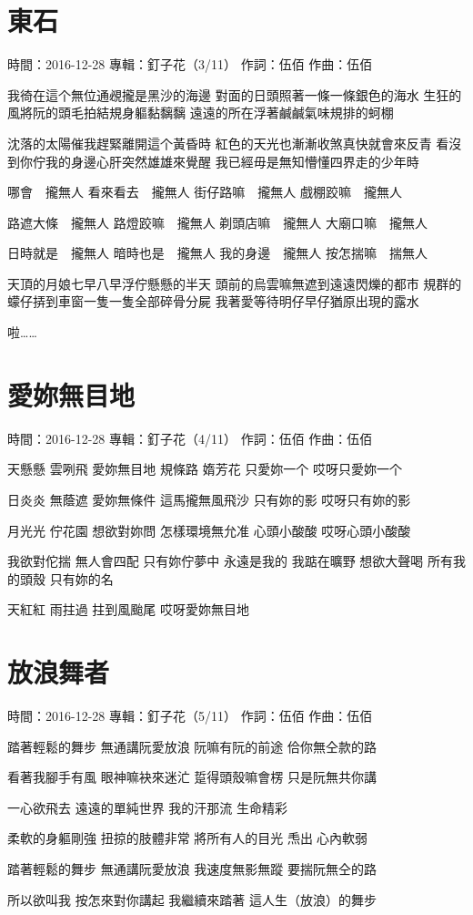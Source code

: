 \documentclass[UTF8,a4paper,oneside,twocolumn,12pt]{ctexbook}
\newcommand{\infopair}[2]{\textbullet #1：#2}
\newcommand{\zc}[1][伍佰]{\infopair{作詞}{#1}}
\newcommand{\zq}[1][伍佰]{\infopair{作曲}{#1}}
\newcommand{\zj}[1]{\infopair{專輯}{#1}}
\newcommand{\sj}[1]{\infopair{時間}{#1}}
\newenvironment{info}{\begin{flushleft}\kaishu
	}
	{\end{flushleft}\normalsize\yahei\par}
\newenvironment{lyric}{
	}
{}
\begin{document}
\section{東石}
\begin{info}
	\sj{2016-12-28}
	\zj{釘子花（3/11）}
	\zc
	\zq
\end{info}
\begin{lyric}
	我徛在這个無位通覕攏是黑沙的海邊
	對面的日頭照著一條一條銀色的海水
	生狂的風將阮的頭毛拍結規身軀黏黐黐
	遠遠的所在浮著鹹鹹氣味規排的蚵棚

	沈落的太陽催我趕緊離開這个黃昏時
	紅色的天光也漸漸收煞真快就會來反青
	看沒到你佇我的身邊心肝突然雄雄來覺醒
	我已經毋是無知懵懂四界走的少年時

	哪會　攏無人
	看來看去　攏無人
	街仔路嘛　攏無人
	戲棚跤嘛　攏無人

	路遮大條　攏無人
	路燈跤嘛　攏無人
	剃頭店嘛　攏無人
	大廟口嘛　攏無人

	日時就是　攏無人
	暗時也是　攏無人
	我的身邊　攏無人
	按怎揣嘛　揣無人

	天頂的月娘七早八早浮佇懸懸的半天
	頭前的烏雲嘛無遮到遠遠閃爍的都市
	規群的蠓仔挵到車窗一隻一隻全部碎骨分屍
	我著愛等待明仔早仔猶原出現的露水

	啦……
\end{lyric}

\section{愛妳無目地}
\begin{info}
	\sj{2016-12-28}
	\zj{釘子花（4/11）}
	\zc
	\zq
\end{info}
\begin{lyric}
	天懸懸 雲咧飛
	愛妳無目地
	規條路 媠芳花
	只愛妳一个 哎呀只愛妳一个

	日炎炎 無蔭遮
	愛妳無條件
	這馬攏無風飛沙
	只有妳的影 哎呀只有妳的影

	月光光 佇花園
	想欲對妳問
	怎樣環境無允准
	心頭小酸酸 哎呀心頭小酸酸

	我欲對佗揣 無人會四配
	只有妳佇夢中 永遠是我的
	我踮在曠野 想欲大聲喝
	所有我的頭殼 只有妳的名

	天紅紅 雨拄過
	拄到風颱尾 哎呀愛妳無目地
\end{lyric}

\section{放浪舞者}
\begin{info}
	\sj{2016-12-28}
	\zj{釘子花（5/11）}
	\zc
	\zq
\end{info}
\begin{lyric}
	踏著輕鬆的舞步
	無通講阮愛放浪
	阮嘛有阮的前途
	佮你無仝款的路

	看著我腳手有風
	眼神嘛袂來迷汒
	踅得頭殼嘛會楞
	只是阮無共你講

	一心欲飛去 遠遠的單純世界
	我的汗那流 生命精彩

	柔軟的身軀剛強
	扭掠的肢體非常
	將所有人的目光
	𤆬出𪜶心內軟弱

	踏著輕鬆的舞步
	無通講阮愛放浪
	我速度無影無蹤
	要揣阮無仝的路

	所以欲叫我 按怎來對你講起
	我繼續來踏著 這人生（放浪）的舞步
\end{lyric}
\end{document}
